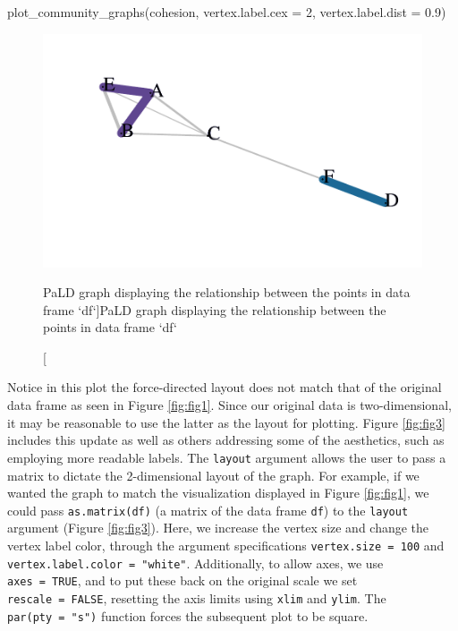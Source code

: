 \begin{Schunk}
\begin{Sinput}
plot_community_graphs(cohesion, 
                      vertex.label.cex = 2,
                      vertex.label.dist = 0.9)
\end{Sinput}
\begin{figure}
\includegraphics{dagostino-mcgowan_files/figure-latex/fig2-1} \caption[PaLD graph displaying the relationship between the points in data frame `df`]{PaLD graph displaying the relationship between the points in data frame `df`}\label{fig:fig2}
\end{figure}
\end{Schunk}

Notice in this plot the force-directed layout does not match that of the
original data frame as seen in Figure \ref{fig:fig1}. Since our original
data is two-dimensional, it may be reasonable to use the latter as the
layout for plotting. Figure \ref{fig:fig3} includes this update as well
as others addressing some of the aesthetics, such as employing more
readable labels. The \texttt{layout} argument allows the user to pass a
matrix to dictate the 2-dimensional layout of the graph. For example, if
we wanted the graph to match the visualization displayed in Figure
\ref{fig:fig1}, we could pass \texttt{as.matrix(df)} (a matrix of the
data frame \texttt{df}) to the \texttt{layout} argument (Figure
\ref{fig:fig3}). Here, we increase the vertex size and change the vertex
label color, through the argument specifications
\texttt{vertex.size\ =\ 100} and
\texttt{vertex.label.color\ =\ "white"}. Additionally, to allow axes, we
use \texttt{axes\ =\ TRUE}, and to put these back on the original scale
we set \texttt{rescale\ =\ FALSE}, resetting the axis limits using
\texttt{xlim} and \texttt{ylim}. The \texttt{par(pty\ =\ "s")} function
forces the subsequent plot to be square.

